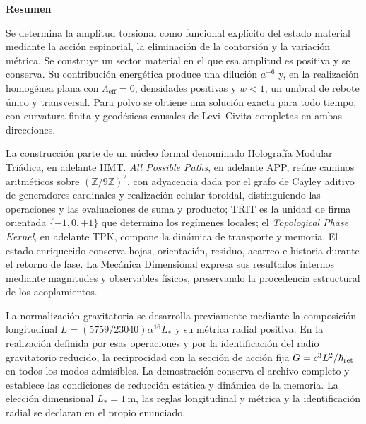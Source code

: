 
\begin{center}\bfseries Resumen\end{center}
\begingroup
\fontsize{10}{12}\selectfont
\setlength{\parskip}{2pt plus 1pt minus .5pt}
\noindent
Se determina la amplitud torsional como funcional explícito del estado
material mediante la acción espinorial, la eliminación de la contorsión
y la variación métrica. Se construye un sector material en el que esa
amplitud es positiva y se conserva. Su contribución energética produce
una dilución \(a^{-6}\) y, en la realización homogénea plana con
\(\Lambda_{\mathrm{eff}}=0\), densidades positivas y \(w<1\), un umbral
de rebote único y transversal. Para polvo se obtiene una solución exacta
para todo tiempo, con curvatura finita y geodésicas causales de
Levi--Civita completas en ambas direcciones.

La construcción parte de un núcleo formal denominado Holografía Modular
Triádica, en adelante HMT. \emph{All Possible Paths}, en adelante APP,
reúne caminos aritméticos sobre \((\mathbb Z/9\mathbb Z)^2\), con
adyacencia dada por el grafo de Cayley aditivo de generadores cardinales
y realización celular toroidal, distinguiendo las operaciones y las
evaluaciones de suma y producto;
TRIT es la unidad de firma orientada \(\{-1,0,+1\}\) que determina los
regímenes locales; el \emph{Topological Phase Kernel}, en adelante TPK,
compone la dinámica de transporte y memoria. El estado enriquecido
conserva hojas, orientación, residuo, acarreo e historia durante el
retorno de fase. La Mecánica Dimensional expresa sus resultados
internos mediante magnitudes y observables físicos, preservando la
procedencia estructural de los acoplamientos.

La normalización gravitatoria se desarrolla previamente mediante la
composición longitudinal \(L=(5759/23040)\alpha^{16}L_*\) y su
métrica radial positiva. En la realización definida por esas operaciones
y por la identificación del radio gravitatorio reducido, la reciprocidad
con la sección de acción fija \(G=c^3L^2/\hbar_{\rm ret}\) en todos
los modos admisibles. La demostración conserva el archivo completo y
establece las condiciones de reducción estática y dinámica de la memoria.
La elección dimensional \(L_*=1\,\mathrm m\), las reglas longitudinal
y métrica y la identificación radial se declaran en el propio enunciado.

